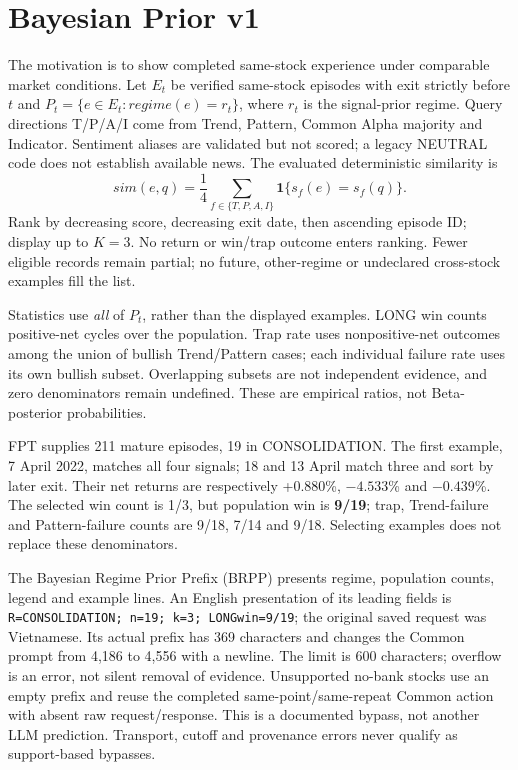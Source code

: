 \section{Bayesian Prior v1}\label{s:b6cb474a799cc0da}
The motivation is to show completed same-stock experience under comparable
market conditions. Let $E_t$ be verified same-stock episodes with exit
strictly before $t$ and $P_t=\{e\in E_t:regime(e)=r_t\}$, where $r_t$ is the
signal-prior regime. Query directions T/P/A/I come from Trend, Pattern,
Common Alpha majority and Indicator. Sentiment aliases are validated but
not scored; a legacy NEUTRAL code does not establish available news.
The evaluated deterministic similarity is
\begin{equation}\label{eq:v1}
sim(e,q)=\frac14\sum_{f\in\{T,P,A,I\}}\mathbf1\{s_f(e)=s_f(q)\}.
\end{equation}
Rank by decreasing score, decreasing exit date, then ascending episode
ID; display up to $K=3$. No return or win/trap outcome enters ranking.
Fewer eligible records remain partial; no future, other-regime or
undeclared cross-stock examples fill the list.

Statistics use \emph{all} of $P_t$, rather than the displayed examples.
LONG win counts positive-net cycles over the population. Trap rate uses
nonpositive-net outcomes among the union of bullish Trend/Pattern cases;
each individual failure rate uses its own bullish subset. Overlapping
subsets are not independent evidence, and zero denominators remain
undefined. These are empirical ratios, not Beta-posterior probabilities.

FPT supplies 211 mature episodes, 19 in CONSOLIDATION. The first example,
7 April 2022, matches all four signals; 18 and 13 April match three and
sort by later exit. Their net returns are respectively +0.880\%,
$-4.533$\% and $-0.439$\%. The selected win count is 1/3,
but population win is \textbf{9/19}; trap, Trend-failure and Pattern-failure
counts are 9/18, 7/14 and 9/18. Selecting examples does not replace these
denominators.

The Bayesian Regime Prior Prefix (BRPP) presents regime, population
counts, legend and example lines. An English presentation of its leading
fields is \texttt{R=CONSOLIDATION; n=19; k=3; LONGwin=9/19}; the original
saved request was Vietnamese. Its actual prefix has 369 characters and
changes the Common prompt from 4,186 to 4,556 with a newline. The limit is
600 characters; overflow is an error, not silent removal of evidence.
Unsupported no-bank stocks use an empty prefix and reuse the completed
same-point/same-repeat Common action with absent raw request/response.
This is a documented bypass, not another LLM prediction. Transport,
cutoff and provenance errors never qualify as support-based bypasses.

